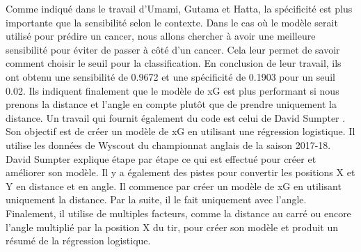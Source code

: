 \documentclass[12pt]{article}
\begin{document}
Comme indiqué dans le travail d'Umami, Gutama et Hatta, la spécificité est plus importante que la sensibilité selon le contexte.
Dans le cas où le modèle serait utilisé pour prédire un cancer, nous allons chercher à avoir une meilleure sensibilité pour éviter de passer à côté d'un cancer. \cite{umamiImplementingExpectedGoal2021}
Cela leur permet de savoir comment choisir le seuil pour la classification.
En conclusion de leur travail, ils ont obtenu une sensibilité de 0.9672 et une spécificité de 0.1903 pour un seuil 0.02.
Ils indiquent finalement que le modèle de xG est plus performant si nous prenons la distance et l'angle en compte plutôt que de prendre uniquement la distance.
\newline\newline
Un travail qui fournit également du code est celui de David Sumpter \cite{sumpterFittingXGModel}.
Son objectif est de créer un modèle de xG en utilisant une régression logistique.
Il utilise les données de Wyscout du championnat anglais de la saison 2017-18.
David Sumpter explique étape par étape ce qui est effectué pour créer et améliorer son modèle.
Il y a également des pistes pour convertir les positions X et Y en distance et en angle.
Il commence par créer un modèle de xG en utilisant uniquement la distance.
Par la suite, il le fait uniquement avec l'angle.
Finalement, il utilise de multiples facteurs, comme la distance au carré ou encore l'angle multiplié par la position X du tir, pour créer son modèle et produit un résumé de la régression logistique.
\end{document}
